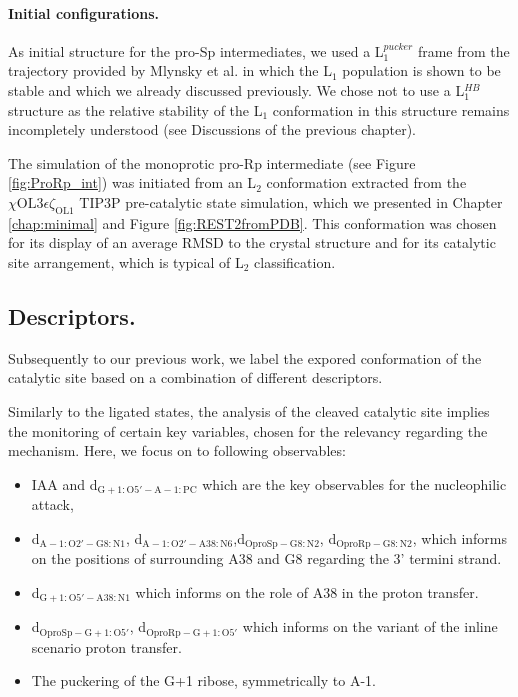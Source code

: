 \documentclass[journal=jacsat,manuscript=article]{achemso}
\begin{document}
\paragraph{Initial configurations.}
As initial structure for the pro-Sp intermediates, 
we used a L$_\mathrm{1}^{pucker}$ frame from the trajectory provided by Mlynsky et al.
in which the L$_\mathrm{1}$ population is shown to be stable and which we already discussed previously.
We chose not to use a L$_\mathrm{1}^{HB}$ structure as the relative stability of the L$_\mathrm{1}$ conformation in this structure remains incompletely understood (see Discussions of the previous chapter).

The simulation of the monoprotic pro-Rp intermediate (see Figure \ref{fig:ProRp_int}) was initiated from an L$_\mathrm{2}$ conformation extracted from the 
$\chi\mathrm{OL3}\epsilon \zeta_\mathrm{OL1}$ TIP3P pre-catalytic state simulation, 
which we presented in Chapter \ref{chap:minimal} and Figure \ref{fig:REST2fromPDB}.
This conformation was chosen for its display of an average RMSD to the crystal structure 
and for its catalytic site arrangement, which is typical of L$_\mathrm{2}$ classification.



\subsection{Descriptors.}

Subsequently to our previous work, we label the expored conformation of the catalytic site based on a combination of different descriptors.



Similarly to the ligated states, 
the analysis of the cleaved catalytic site implies the monitoring of certain key variables, 
chosen for the relevancy regarding the mechanism.
Here, we focus on to following observables: 
\begin{itemize}
    \item IAA and d$_\mathrm{G+1:O5' - A-1:PC}$ which are the key observables for the nucleophilic attack,
    \item d$_\mathrm{A-1:O2' - G8:N1}$, d$_\mathrm{A-1:O2' - A38:N6}$,d$_\mathrm{OproSp - G8:N2}$, d$_\mathrm{OproRp - G8:N2}$, which informs on the positions of surrounding A38 and G8 regarding the 3' termini strand.
    \item d$_\mathrm{G+1:O5' - A38:N1}$ which informs on the role of A38 in the proton transfer.
    \item d$_\mathrm{OproSp - G+1:O5'}$, d$_\mathrm{OproRp - G+1:O5'}$ which informs on the variant of the inline scenario proton transfer.
    \item The puckering of the G+1 ribose, symmetrically to A-1.
\end{itemize}
\end{document}
